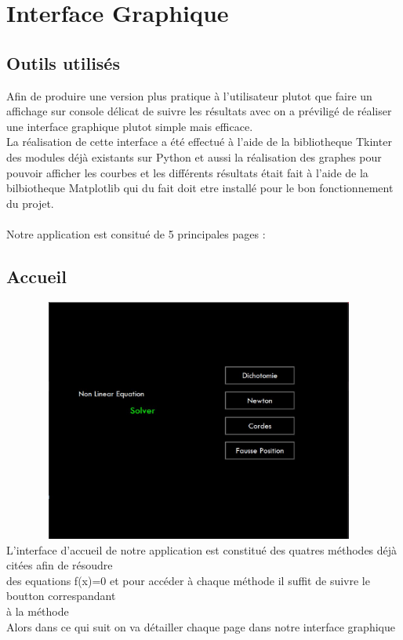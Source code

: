 \documentclass{article}
\begin{document}
\newpage
\section{Interface Graphique}
\subsection{Outils utilisés}
Afin de produire une version plus pratique à l'utilisateur plutot que faire un affichage sur console délicat de suivre les résultats avec on a préviligé de réaliser une interface graphique plutot simple mais efficace.\\
La réalisation de cette interface a été effectué à l'aide de la bibliotheque Tkinter des modules déjà existants sur Python et aussi la réalisation des graphes pour pouvoir afficher les courbes et les différents résultats était fait à l'aide de la bilbiotheque Matplotlib qui du fait doit etre installé pour le bon fonctionnement du projet.
\\ \\
Notre application est consitué de 5 principales pages :
\subsection{Accueil}
\includegraphics[width=13cm,height=8cm]{img/accueil.JPG}\\

L'interface d'accueil de notre application est constitué des quatres méthodes déjà citées afin de résoudre \\ des equations f(x)=0 et pour accéder à chaque méthode il suffit de suivre le boutton correspandant \\
à la méthode\\
Alors dans ce qui suit on va détailler chaque page dans notre interface graphique 
\end{document}
